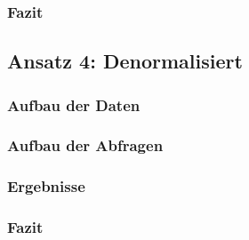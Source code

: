 \subsubsection{Fazit}


\subsection{Ansatz 4: Denormalisiert}
\subsubsection{Aufbau der Daten}
\subsubsection{Aufbau der Abfragen}
\subsubsection{Ergebnisse}
\subsubsection{Fazit}